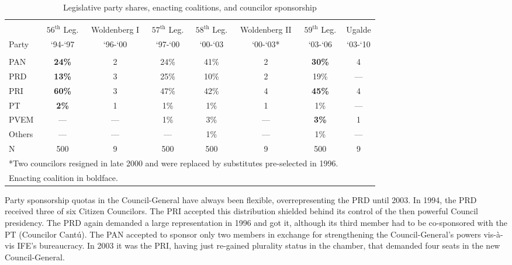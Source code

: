 \documentclass[12 pt, letter]{article}
\renewcommand{\footnote}{\endnote}
\begin{document}
\begin{sidewaystable}
\caption{Legislative party shares, enacting coalitions, and
councilor sponsorship}\label{T:proposals}
\begin{center}
\begin{tabular}{lccccccc}
\hline\\ [-1.5ex]
      & $56^{\text{th}}$ Leg. & Woldenberg I & $57^{\text{th}}$ Leg. & $58^{\text{th}}$ Leg. & Woldenberg II & $59^{\text{th}}$ Leg. & Ugalde \\
Party &  `94-`97  &  `96-`00  &  `97-`00  &  `00-`03  &  `00-`03*  &  `03-`06  &  `03-`10 \\
\hline\\ [-1ex]
 PAN  & \textbf{24\%} & 2   & 24\% & 41\% & 2   & \textbf{30\%} & 4   \\
 PRD  & \textbf{13\%} & 3   & 25\% & 10\% & 2   & 19\%          & --- \\
 PRI  & \textbf{60\%} & 3   & 47\% & 42\% & 4   & \textbf{45\%} & 4   \\
 PT   & \textbf{ 2\%} & 1   &  1\% &  1\% & 1   & 1\%           & --- \\
 PVEM & ---           & --- &  1\% &  3\% & --- & \textbf{3\%}  & 1   \\
 Others & ---         & --- &  --- &  1\% & --- & 1\%           & --- \\
 N    & 500           & 9   &  500 &  500 & 9   & 500           & 9   \\
\hline
\multicolumn{7}{l}{\footnotesize{*Two councilors resigned in late 2000 and were replaced by substitutes pre-selected in 1996.}}\\
\multicolumn{7}{l}{\footnotesize{Enacting coalition in boldface.}}\\
\end{tabular}
\end{center}
\end{sidewaystable}

Party sponsorship quotas in the Council-General have always been flexible, overrepresenting the PRD until 2003.  In 1994, the PRD received three of six Citizen Councilors.  The PRI accepted this distribution shielded behind its control of the then powerful Council presidency.  The PRD again demanded a large representation in 1996 and got it, although its third member had to be co-sponsored with the PT (Councilor Cant\'u).  The PAN accepted to sponsor only two members in exchange for strengthening the Council-General's powers vis-\`{a}-vis IFE's bureaucracy.  In 2003 it was the PRI, having just re-gained plurality status in the chamber, that demanded four seats in the new Council-General.%
\end{document}
